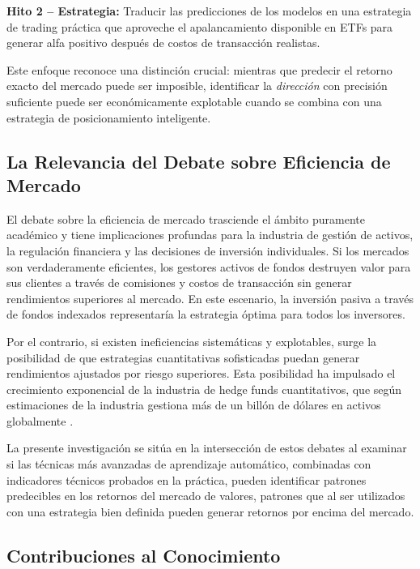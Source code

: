\documentclass[11pt,a4paper]{article}
\begin{document}
\textbf{Hito 2 -- Estrategia:} Traducir las predicciones de los modelos en una estrategia de trading práctica que aproveche el apalancamiento disponible en ETFs para generar alfa positivo después de costos de transacción realistas.

Este enfoque reconoce una distinción crucial: mientras que predecir el retorno exacto del mercado puede ser imposible, identificar la \textit{dirección} con precisión suficiente puede ser económicamente explotable cuando se combina con una estrategia de posicionamiento inteligente.

\subsection{La Relevancia del Debate sobre Eficiencia de Mercado}

El debate sobre la eficiencia de mercado trasciende el ámbito puramente académico y tiene implicaciones profundas para la industria de gestión de activos, la regulación financiera y las decisiones de inversión individuales. Si los mercados son verdaderamente eficientes, los gestores activos de fondos destruyen valor para sus clientes a través de comisiones y costos de transacción sin generar rendimientos superiores al mercado. En este escenario, la inversión pasiva a través de fondos indexados representaría la estrategia óptima para todos los inversores.

Por el contrario, si existen ineficiencias sistemáticas y explotables, surge la posibilidad de que estrategias cuantitativas sofisticadas puedan generar rendimientos ajustados por riesgo superiores. Esta posibilidad ha impulsado el crecimiento exponencial de la industria de hedge funds cuantitativos, que según estimaciones de la industria gestiona más de un billón de dólares en activos globalmente \citep{preqin2024}.

La presente investigación se sitúa en la intersección de estos debates al examinar si las técnicas más avanzadas de aprendizaje automático, combinadas con indicadores técnicos probados en la práctica, pueden identificar patrones predecibles en los retornos del mercado de valores, patrones que al ser utilizados con una estrategia bien definida pueden generar retornos por encima del mercado.

\subsection{Contribuciones al Conocimiento}
\end{document}
